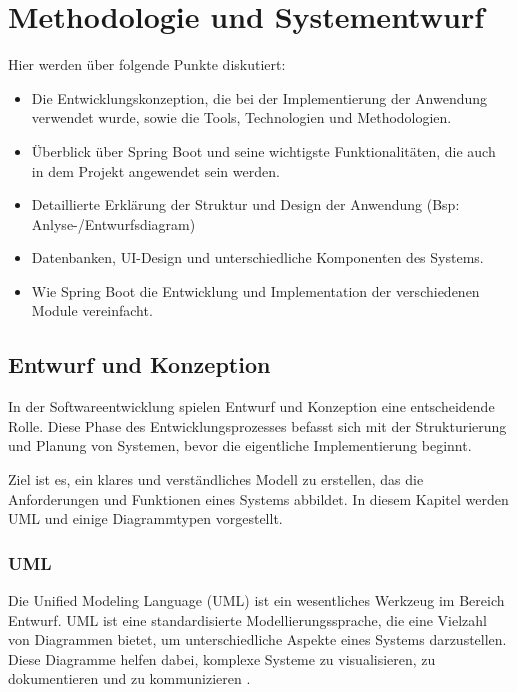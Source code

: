 \chapter{Methodologie und Systementwurf }

Hier werden über folgende Punkte diskutiert:

\begin{itemize}
	\item Die Entwicklungskonzeption, die bei der Implementierung der Anwendung verwendet wurde, sowie die Tools, Technologien und Methodologien. 
	\item Überblick über Spring Boot und seine wichtigste  Funktionalitäten, die auch in dem Projekt angewendet sein werden. 
	\item Detaillierte Erklärung der Struktur und Design der Anwendung (Bsp: Anlyse-/Entwurfsdiagram) 
	\item Datenbanken, UI-Design und unterschiedliche Komponenten des Systems. 
	\item Wie Spring Boot die Entwicklung und Implementation der verschiedenen Module vereinfacht. 
\end{itemize}


\section{Entwurf und Konzeption}

In der Softwareentwicklung spielen Entwurf und Konzeption eine entscheidende Rolle. Diese Phase des Entwicklungsprozesses befasst sich mit der Strukturierung und Planung von Systemen, bevor die eigentliche Implementierung beginnt. 

Ziel ist es, ein klares und verständliches Modell zu erstellen, das die Anforderungen und Funktionen eines Systems abbildet. In diesem Kapitel werden UML und einige Diagrammtypen vorgestellt.

\subsection{UML}

Die Unified Modeling Language (UML) ist ein wesentliches Werkzeug im Bereich Entwurf. UML ist eine standardisierte Modellierungssprache, die eine Vielzahl von Diagrammen bietet, um unterschiedliche Aspekte eines Systems darzustellen. Diese Diagramme helfen dabei, komplexe Systeme zu visualisieren, zu dokumentieren und zu kommunizieren \cite{UML:2023}. 

